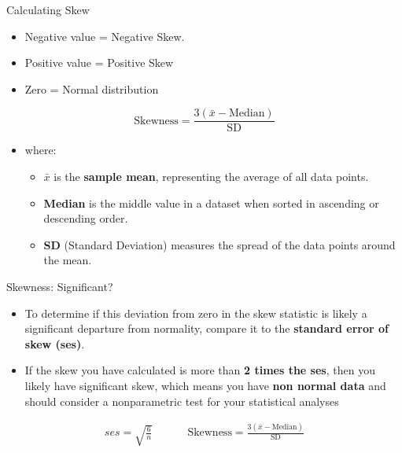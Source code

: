\documentclass[
  ignorenonframetext,
]{beamer}
\providecommand{\tightlist}{%
  \setlength{\itemsep}{0pt}\setlength{\parskip}{0pt}}
\begin{document}
\begin{frame}{Calculating Skew}
\label{calculating-skew}
\begin{itemize}
\tightlist
\item
  Negative value = Negative Skew.
\end{itemize}

\begin{itemize}
\tightlist
\item
  Positive value = Positive Skew
\end{itemize}

\begin{itemize}
\tightlist
\item
  Zero = Normal distribution
\end{itemize}

\[\text{Skewness} = \frac{3(\bar{x} - \text{Median})}{\text{SD}}\]

\begin{itemize}
\tightlist
\item
  where:

  \begin{itemize}
  \tightlist
  \item
    \(\bar{x}\) is the \textbf{sample mean}, representing the average of
    all data points.
  \item
    \textbf{Median} is the middle value in a dataset when sorted in
    ascending or descending order.
  \item
    \textbf{SD} (Standard Deviation) measures the spread of the data
    points around the mean.
  \end{itemize}
\end{itemize}
\end{frame}

\begin{frame}{Skewness: Significant?}
\label{skewness-significant}
\begin{itemize}
\item
  To determine if this deviation from zero in the skew statistic is
  likely a significant departure from normality, compare it to the
  \textbf{standard error of skew (ses)}.
\item
  If the skew you have calculated is more than \textbf{2 times the ses},
  then you likely have significant skew, which means you have
  \textbf{non normal data} and should consider a nonparametric test for
  your statistical analyses
\end{itemize}

\[
\begin{array}{cc}
ses = \sqrt{\frac{6}{n}} & \hspace{1cm} \text{Skewness} = \frac{3(\bar{x} - \text{Median})}{\text{SD}}
\end{array}
\]
\end{frame}
\end{document}
